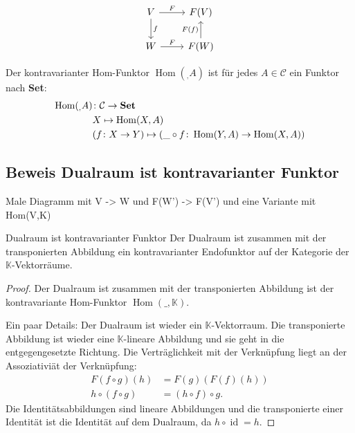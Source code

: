 \documentclass[a4paper]{amsart}
\theoremstyle{definition}
\DeclareMathOperator{\id}{id}
\DeclareMathOperator{\Hom}{Hom}
\newcommand{\K}{\ensuremath{\mathbb{ K }}}
\begin{document}
\begin{equation}
   \begin{tikzcd}
      V \arrow[r, "F"] \arrow[d, "f"] & F(V)\\
      W \arrow[r, "F"]                & F(W) \arrow[u, "F(f)"]
   \end{tikzcd}
\end{equation}

Der kontravarianter Hom-Funktor $\Hom( _, A)$ ist für jedes $A \in \mathcal{C}$ ein Funktor nach \textbf{Set}:
\begin{align}
   \Hom( _, A) &\colon \mathcal{C} \to \text{\textbf{Set}}\\
   &X \mapsto \Hom( X, A)\\
   &(f \colon X \to Y ) \mapsto (\_ \circ f \colon \Hom( Y, A) \to \Hom( X, A))
\end{align}

\subsection{Beweis Dualraum ist kontravarianter Funktor}
Male Diagramm mit V -> W und F(W') -> F(V') und eine Variante mit Hom(V,K)

\begin{Theorem}{Dualraum ist kontravarianter Funktor}
   Der Dualraum ist zusammen mit der transponierten Abbildung ein kontravarianter Endofunktor auf der Kategorie der $\K$-Vektorräume.   
\end{Theorem}
\begin{proof}
   Der Dualraum ist zusammen mit der transponierten Abbildung ist der kontravariante Hom-Funktor 
   $\Hom( \_, \K )$.
   
   Ein paar Details: Der Dualraum ist wieder ein $\K$-Vektorraum. Die transponierte Abbildung ist wieder eine $\K$-lineare Abbildung und sie geht in die entgegengesetzte Richtung. Die Verträglichkeit mit der Verknüpfung liegt an der Assoziativiät der Verknüpfung:
   \begin{align}
      F( f \circ g )( h ) &= F(g)(F(f )(h))\\
      h \circ (f \circ g) &= (h \circ f) \circ g.
   \end{align}
   Die Identitätsabbildungen sind lineare Abbildungen und die transponierte einer Identität ist die Identität auf dem Dualraum, da $h \circ \id = h$.
\end{proof}
\end{document}
